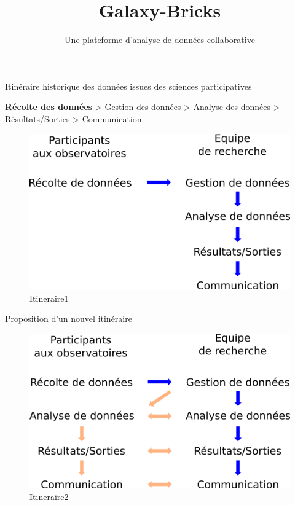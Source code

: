\documentclass[ignorenonframetext,]{beamer}
\title{Galaxy-Bricks}
\subtitle{Une plateforme d'analyse de données collaborative}
\date{}
\begin{document}
\frame{\titlepage}

\begin{frame}{Itinéraire historique des données issues des sciences
participatives}

\textbf{Récolte des données} \textgreater{} Gestion des données
\textgreater{} Analyse des données \textgreater{} Résultats/Sorties
\textgreater{} Communication

\begin{figure}
\centering
\includegraphics{figures/Itineraire1.png}
\caption{Itineraire1}
\end{figure}

\end{frame}

\begin{frame}{Proposition d'un nouvel itinéraire}

\begin{figure}
\centering
\includegraphics{figures/Itineraire2.png}
\caption{Itineraire2}
\end{figure}

\end{frame}
\end{document}
